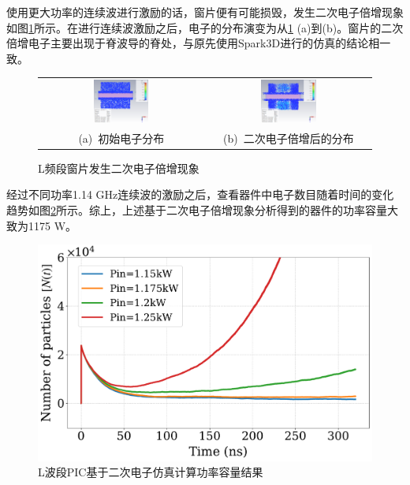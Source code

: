 \documentclass[master]{thesis-uestc}
\begin{document}
使用更大功率的连续波进行激励的话，窗片便有可能损毁，发生二次电子倍增现象如图\ref{fig:L发生二次电子倍增}所示。在进行连续波激励之后，电子的分布演变为从\ref{fig:L发生二次电子倍增} (a)到(b)。窗片的二次倍增电子主要出现于脊波导的脊处，与原先使用Spark3D进行的仿真的结论相一致。
\begin{figure}[!htb]
    \small
    \centering
    \begin{tabular}{@{\ }c@{\ }c}
        \includegraphics[width=0.35\textwidth]{pic/chapter4/L电子初始分布顶视图.png} & 
        \hspace{5pt}
        \includegraphics[width=0.35\textwidth]{pic/chapter4/L电子分布-二次电子倍增-顶视图.png}     \\
        \mbox{\small (a) 初始电子分布}                                                                               & 
        \mbox{\small (b) 二次电子倍增后的分布}                                                                                  \\
    \end{tabular}
    \caption{L频段窗片发生二次电子倍增现象}
    \label{fig:L发生二次电子倍增}
\end{figure}

经过不同功率1.14 GHz连续波的激励之后，查看器件中电子数目随着时间的变化趋势如图\ref{fig:L波段PIC基于二次电子仿真计算功率容量结果}所示。综上，上述基于二次电子倍增现象分析得到的器件的功率容量大致为1175 W。
\begin{figure}[!htb]
    \centering
    \includegraphics[width=0.5\linewidth]{pic/chapter4/particle_time_chapter4.pdf}
    \caption{L波段PIC基于二次电子仿真计算功率容量结果}
    \label{fig:L波段PIC基于二次电子仿真计算功率容量结果}
\end{figure}
\end{document}
